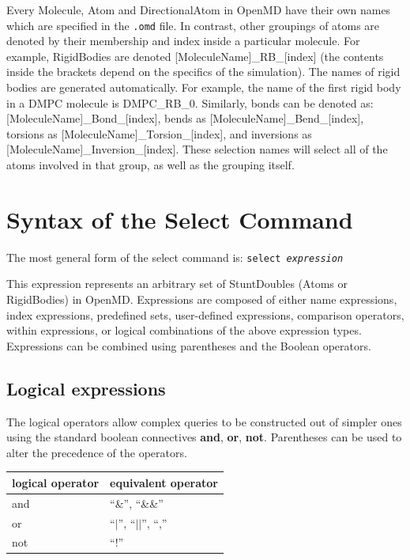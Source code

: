 \documentclass[]{book}
\begin{document}
Every Molecule, Atom and DirectionalAtom in {\sc OpenMD} have their
own names which are specified in the {\tt .omd} file. In contrast,
other groupings of atoms are denoted by their membership and index
inside a particular molecule.  For example, RigidBodies are denoted
[MoleculeName]\_RB\_[index] (the contents inside the brackets depend
on the specifics of the simulation). The names of rigid bodies are
generated automatically. For example, the name of the first rigid body
in a DMPC molecule is DMPC\_RB\_0.  Similarly, bonds can be denoted
as: [MoleculeName]\_Bond\_[index], bends as
[MoleculeName]\_Bend\_[index], torsions as
[MoleculeName]\_Torsion\_[index], and inversions as
[MoleculeName]\_Inversion\_[index].  These selection names will select
all of the atoms involved in that group, as well as the grouping
itself.  

\section{\label{section:syntax}Syntax of the Select Command}

The most general form of the select command is: {\tt select {\it expression}}

This expression represents an arbitrary set of StuntDoubles (Atoms or
RigidBodies) in {\sc OpenMD}. Expressions are composed of either name
expressions, index expressions, predefined sets, user-defined
expressions, comparison operators, within expressions, or logical
combinations of the above expression types. Expressions can be
combined using parentheses and the Boolean operators.

\subsection{\label{section:logical}Logical expressions}

The logical operators allow complex queries to be constructed out of
simpler ones using the standard boolean connectives {\bf and}, {\bf
or}, {\bf not}. Parentheses can be used to alter the precedence of the
operators.

\begin{center}
\begin{tabular}{|ll|}
\hline
{\bf logical operator} & {\bf equivalent operator}  \\  
\hline
and & ``\&'', ``\&\&'' \\
or & ``$|$'', ``$||$'', ``,'' \\
not & ``!''  \\
\hline
\end{tabular}
\end{center}
\end{document}
